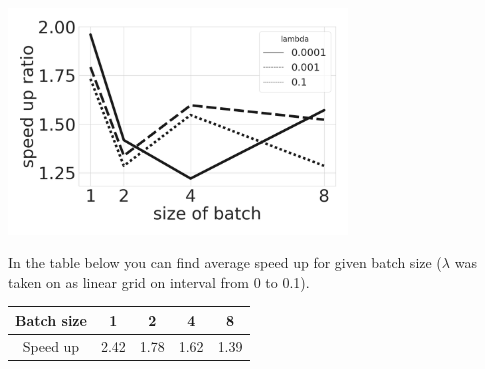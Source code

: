 \documentclass{article}
\begin{document}
\includegraphics[width=90mm]{speed_batch_size.png}


In the table below you can find average speed up for given batch size ($\lambda$ was taken on as linear grid on interval from 0 to 0.1).

\begin{tabular}{ |c|c|c|c|c| }
 \hline
 Batch size & 1 & 2 & 4 & 8 \\
 \hline
 Speed up & 2.42 & 1.78 & 1.62 & 1.39 \\
 \hline
\end{tabular}


\newpage
{}



\printbibliography
\end{document}
